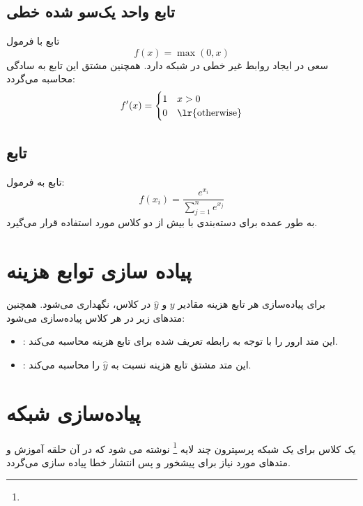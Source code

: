 \documentclass[11pt]{article}
\begin{document}
	\subsection{تابع واحد یک‌سو شده خطی}
	تابع 
	با فرمول 
	\[ f(x) = \max (0, x )\]
	سعی در ایجاد روابط غیر خطی در شبکه دارد.
	همچنین مشتق این تابع به سادگی محاسبه می‌گردد:
	$$ f'(x) = \begin{cases} 1 & x > 0 \\ 0 & \text{\lr{otherwise}} \end{cases} $$
	\subsection{
		تابع
	}
	تابع 
	به فرمول:
	\[ f(x_i) = \frac{e^{x_i}}{\sum_{j = 1}^{n} e^{x_j}} \]
	به طور عمده برای دسته‌بندی با بیش از دو کلاس مورد استفاده قرار می‌گیرد.
	\section{پیاده سازی توابع هزینه}
	برای پیاده‌سازی هر تابع هزینه مقادیر $y$ و $\hat{y}$ در کلاس، نگهداری می‌شود.
	همچنین متد‌های زیر در هر کلاس پیاده‌سازی می‌شود:
	\begin{itemize}
		\item {} : این متد ارور را با توجه به رابطه تعریف شده برای تابع هزینه محاسبه می‌کند.
		\item {} : این متد مشتق تابع هزینه نسبت به $\hat{y}$
		را محاسبه می‌کند.
	\end{itemize}
	\section{پیاده‌سازی شبکه}
	یک کلاس برای یک شبکه پرسپترون چند لایه
	\footnote{}
	 نوشته می شود که در آن حلقه آموزش و متد‌های مورد نیاز برای پیشخور و پس انتشار خطا پیاده سازی می‌گردد.
\end{document}
